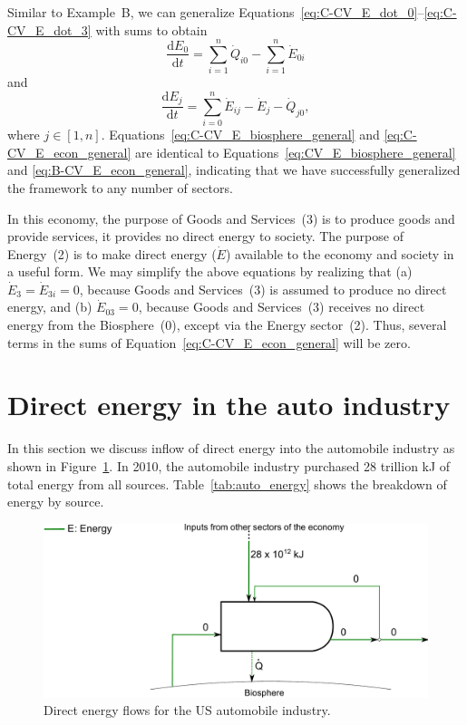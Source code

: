 Similar to Example~B, we can generalize 
Equations~\ref{eq:C-CV_E_dot_0}--\ref{eq:C-CV_E_dot_3}
with sums to obtain
%
\begin{equation} \label{eq:C-CV_E_biosphere_general}
	\frac{\mathrm{d}E_{0}}{\mathrm{d}t} 	 
	= \sum\limits_{i=1}^n \dot{Q}_{i0} - \sum\limits_{i=1}^n \dot{E}_{0i}
\end{equation}
%
and
%
\begin{equation} \label{eq:C-CV_E_econ_general}
	\frac{\mathrm{d}E_{j}}{\mathrm{d}t} 
	= \sum\limits_{i=0}^n\dot{E}_{ij} 
	- \dot{E}_{j}  
	- \dot{Q}_{j0},
\end{equation}
%
where $j \in [1, n]$. 
Equations~\ref{eq:C-CV_E_biosphere_general} and 
\ref{eq:C-CV_E_econ_general} are identical to 
Equations~\ref{eq:CV_E_biosphere_general} and 
\ref{eq:B-CV_E_econ_general}, 
indicating that we have successfully generalized 
the framework to any number of sectors.

In this economy, the purpose of Goods and Services~(3) 
is to produce goods and provide services, 
it provides no direct energy to society. 
The purpose of Energy~(2) is to make direct energy ($\dot{E}$) 
available to the economy and society in a useful form.
We may simplify the above equations
by realizing that (a)~$\dot{E}_{3} = \dot{E}_{3i} = 0$, 
because Goods and Services~(3)
is assumed to produce no direct energy, 
and (b) $\dot{E}_{03} = 0$, 
because Goods and Services~(3) 
receives no direct energy from the Biosphere~(0), 
except via the Energy sector~(2).
Thus, several terms in the sums of
Equation~\ref{eq:C-CV_E_econ_general}
will be zero.


\section{Direct energy in the auto industry}
\label{sec:energy_auto}

In this section we discuss inflow of direct energy into the automobile industry
as shown in Figure~\ref{fig:PERKS_energy_auto}.
In 2010, the automobile industry purchased 28 trillion kJ of total energy from all sources. 
Table~\ref{tab:auto_energy} shows the breakdown of energy by source. 

\begin{figure}[!ht]
\centering
\includegraphics[width=\linewidth]{Part_1/Chapter_Energy/images/PERKS_basic_unit_energy_auto_ind.pdf}
\caption[Direct energy flows for the US automobile industry]
{Direct energy flows for the US automobile industry.\cite[Table 7.6]{EIA:2014aa}}
\label{fig:PERKS_energy_auto}
\end{figure}


